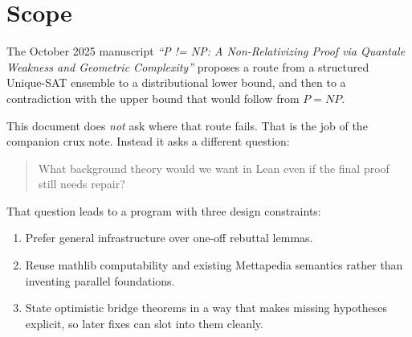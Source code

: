 \documentclass[11pt]{article}
\theoremstyle{remark}
\begin{document}
\begin{abstract}
extractor is reused across the switched family and only the downstream combiner
varies, then the code budget collapses to the combiner alone.
The Meredith-side limit is now considerably sharper.  The currently formalized
weakness bridge exports only global evidence scalars, so any predictor factoring
only through those summaries is constant on the whole state space.  The current
exact HML layer is infinitary by default: if the certified minimal-context type
is infinite, then even the depth-1 fragment is infinite, and the concrete rho
instance already realizes that case.  And one layer below exact HML, the
concrete rho present-moment external channels already realizes arbitrary finite
membership patterns on a natural probe slice: a single-output probe state
against a flat bag of input guards records exactly which channels are present in
the environment.
On the semantic side, it now includes a depth-bounded GSLT/HML observational
kernel, a bridge from bisimulation quotients to quantale weakness, and a first
concrete minimal-context instance for the rho calculus.  This isolates the exact
positive shape that a successful switching theorem would need: not mere
locality, but locality together with a concrete compression theorem, a clean
finite learning interface, and an explicit observational/evidence semantics.
\end{abstract}

\tableofcontents

\section{Scope}

The October 2025 manuscript
\emph{``P != NP: A Non-Relativizing Proof via Quantale Weakness and Geometric
Complexity''} proposes a route from a structured Unique-SAT ensemble to a
distributional lower bound, and then to a contradiction with the upper bound that
would follow from $P=NP$.

This document does \emph{not} ask where that route fails.  That is the job of the
companion crux note.  Instead it asks a different question:

\begin{quote}
What background theory would we want in Lean even if the final proof still needs
repair?
\end{quote}

That question leads to a program with three design constraints:
\begin{enumerate}[leftmargin=1.5em]
  \item Prefer general infrastructure over one-off rebuttal lemmas.
  \item Reuse mathlib computability and existing Mettapedia semantics rather than
  inventing parallel foundations.
  \item State optimistic bridge theorems in a way that makes missing hypotheses
  explicit, so later fixes can slot into them cleanly.
\end{enumerate}
\end{document}
